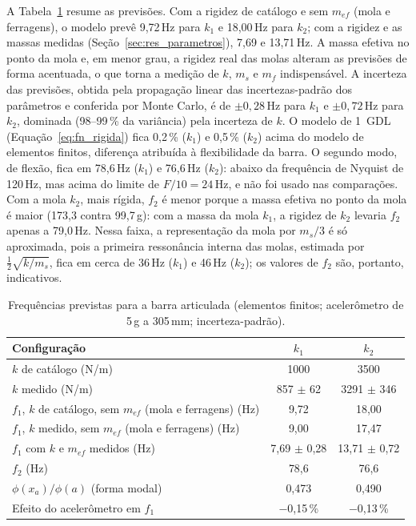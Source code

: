 \documentclass[a4paper,10pt,twocolumn]{article}
\begin{document}
A Tabela~\ref{tab:previsao} resume as previsões. Com a rigidez de catálogo e sem $m_{ef}$ (mola e ferragens), o modelo prevê 9,72\,Hz para $k_1$ e 18,00\,Hz para $k_2$; com a rigidez e as massas medidas (Seção~\ref{sec:res_parametros}), 7,69 e 13,71\,Hz. A massa efetiva no ponto da mola e, em menor grau, a rigidez real das molas alteram as previsões de forma acentuada, o que torna a medição de $k$, $m_s$ e $m_f$ indispensável. A incerteza das previsões, obtida pela propagação linear das incertezas-padrão dos parâmetros e conferida por Monte Carlo, é de $\pm 0{,}28$\,Hz para $k_1$ e $\pm 0{,}72$\,Hz para $k_2$, dominada (98--99\,\% da variância) pela incerteza de $k$. O modelo de 1~GDL (Equação~\ref{eq:fn_rigida}) fica 0,2\,\% ($k_1$) e 0,5\,\% ($k_2$) acima do modelo de elementos finitos, diferença atribuída à flexibilidade da barra. O segundo modo, de flexão, fica em 78,6\,Hz ($k_1$) e 76,6\,Hz ($k_2$): abaixo da frequência de Nyquist de 120\,Hz, mas acima do limite de $F/10 = 24$\,Hz, e não foi usado nas comparações. Com a mola $k_2$, mais rígida, $f_2$ é menor porque a massa efetiva no ponto da mola é maior (173,3 contra 99,7\,g): com a massa da mola $k_1$, a rigidez de $k_2$ levaria $f_2$ apenas a 79,0\,Hz. Nessa faixa, a representação da mola por $m_s/3$ é só aproximada, pois a primeira ressonância interna das molas, estimada por $\tfrac{1}{2}\sqrt{k/m_s}$, fica em cerca de 36\,Hz ($k_1$) e 46\,Hz ($k_2$); os valores de $f_2$ são, portanto, indicativos.

\begin{table}[H]
    \centering
    \caption{Frequências previstas para a barra articulada (elementos finitos; acelerômetro de 5\,g a 305\,mm; incerteza-padrão).}
    \label{tab:previsao}
    \small
    \begin{tabularx}{\columnwidth}{X c c}
        \toprule
        \textbf{Configuração} & \textbf{$k_1$} & \textbf{$k_2$} \\
        \midrule
        $k$ de catálogo (N/m) & 1000 & 3500 \\
        $k$ medido (N/m) & 857 $\pm$ 62 & 3291 $\pm$ 346 \\
        $f_1$, $k$ de catálogo, sem $m_{ef}$ (mola e ferragens) (Hz) & 9,72 & 18,00 \\
        $f_1$, $k$ medido, sem $m_{ef}$ (mola e ferragens) (Hz) & 9,00 & 17,47 \\
        $f_1$ com $k$ e $m_{ef}$ medidos (Hz) & 7,69 $\pm$ 0,28 & 13,71 $\pm$ 0,72 \\
        $f_2$ (Hz) & 78,6 & 76,6 \\
        $\phi(x_a)/\phi(a)$ (forma modal) & 0,473 & 0,490 \\
        Efeito do acelerômetro em $f_1$ & $-$0,15\,\% & $-$0,13\,\% \\
        \bottomrule
    \end{tabularx}
\end{table}
\end{document}
